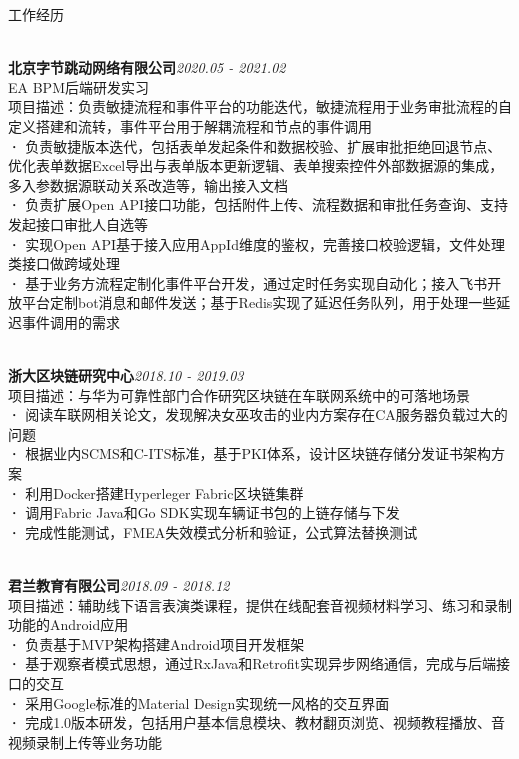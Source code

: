 \documentclass{resume} %
\begin{document}
\begin{rSection}{工作经历}

\\{\bf 北京字节跳动网络有限公司}\hfill {\em 2020.05 - 2021.02}
\\EA BPM后端研发实习\\
项目描述：负责敏捷流程和事件平台的功能迭代，敏捷流程用于业务审批流程的自定义搭建和流转，事件平台用于解耦流程和节点的事件调用\\
\textbf{·} 负责敏捷版本迭代，包括表单发起条件和数据校验、扩展审批拒绝回退节点、优化表单数据Excel导出与表单版本更新逻辑、表单搜索控件外部数据源的集成，多入参数据源联动关系改造等，输出接入文档\\
\textbf{·} 负责扩展Open API接口功能，包括附件上传、流程数据和审批任务查询、支持发起接口审批人自选等\\
\textbf{·} 实现Open API基于接入应用AppId维度的鉴权，完善接口校验逻辑，文件处理类接口做跨域处理\\
\textbf{·} 基于业务方流程定制化事件平台开发，通过定时任务实现自动化；接入飞书开放平台定制bot消息和邮件发送；基于Redis实现了延迟任务队列，用于处理一些延迟事件调用的需求

\\{\bf 浙大区块链研究中心}\hfill {\em 2018.10 - 2019.03}
\\项目描述：与华为可靠性部门合作研究区块链在车联网系统中的可落地场景\\
\textbf{·} 阅读车联网相关论文，发现解决女巫攻击的业内方案存在CA服务器负载过大的问题\\
\textbf{·} 根据业内SCMS和C-ITS标准，基于PKI体系，设计区块链存储分发证书架构方案\\
\textbf{·} 利用Docker搭建Hyperleger Fabric区块链集群\\
\textbf{·} 调用Fabric Java和Go SDK实现车辆证书包的上链存储与下发\\
\textbf{·} 完成性能测试，FMEA失效模式分析和验证，公式算法替换测试

\\{\bf 君兰教育有限公司}\hfill {\em 2018.09 - 2018.12}
\\项目描述：辅助线下语言表演类课程，提供在线配套音视频材料学习、练习和录制功能的Android应用\\
\textbf{·} 负责基于MVP架构搭建Android项目开发框架\\
\textbf{·} 基于观察者模式思想，通过RxJava和Retrofit实现异步网络通信，完成与后端接口的交互\\
\textbf{·} 采用Google标准的Material Design实现统一风格的交互界面\\
\textbf{·} 完成1.0版本研发，包括用户基本信息模块、教材翻页浏览、视频教程播放、音视频录制上传等业务功能

\end{rSection}
\end{document}
